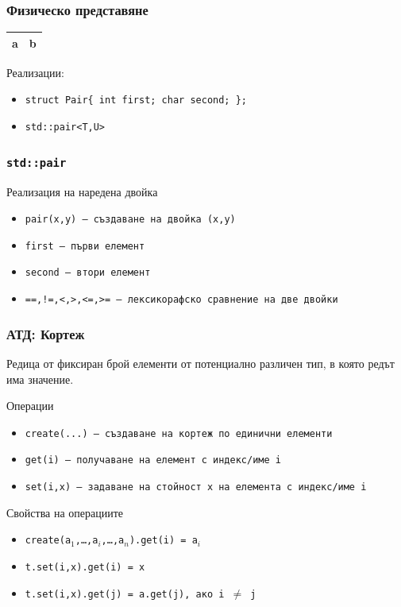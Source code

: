 \documentclass{beamer}
\begin{document}
\begin{frame}[fragile]
  \frametitle{Физическо представяне}

  \begin{center}
    \begin{tabular}{|m{5ex}|m{8ex}|}
      \hline
      \rowcolor{diagramblue}
      a&b\\
      \hline
    \end{tabular}
  \end{center}
  \vspace{2em}

  Реализации:
  \begin{itemize}
  \item \verb#struct Pair{ int first; char second; };#
  \item \verb#std::pair<T,U>#
  \end{itemize}
\end{frame}

\begin{frame}
  \frametitle{\tt{std::pair}}

  Реализация на наредена двойка
  \begin{itemize}
  \item \tt{pair(x,y)} --- създаване на двойка (\tt x,\tt y)
  \item \tt{first} --- първи елемент
  \item \tt{second} --- втори елемент
  \item \tt{==,!=,<,>,<=,>=} --- лексикорафско сравнение на две двойки
  \end{itemize}
\end{frame}

\begin{frame}
  \frametitle{АТД: Кортеж}

  Редица от фиксиран брой елементи от потенциално различен тип, в която редът има значение.
  \vspace{0.5em}

  Операции
  \vspace{0.5em}

  \begin{itemize}
  \item \tt{create(...)} --- създаване на кортеж по единични елементи
  \item \tt{get(i)} --- получаване на елемент с индекс/име \tt i
  \item \tt{set(i,x)} --- задаване на стойност \tt x на елемента с индекс/име \tt i
  \end{itemize}

  Свойства на операциите
  \vspace{0.5em}

  \begin{itemize}
  \item \tt{create(a$_1$,\ldots,a$_i$,\ldots,a$_n$).get(i)} = \tt{a$_i$}
  \item \tt{t.set(i,x).get(i)} = \tt x
  \item \tt{t.set(i,x).get(j)} = \tt{a.get(j)}, ако \tt{i $\neq$ j}
  \end{itemize}
  
\end{frame}
\end{document}
